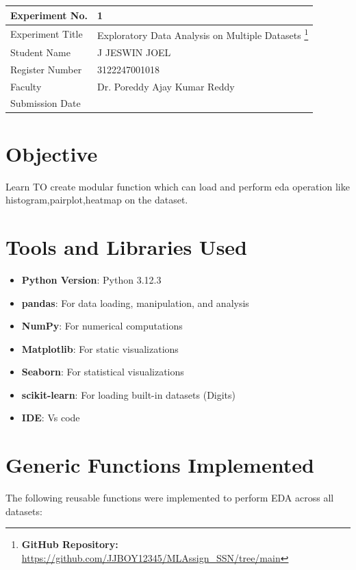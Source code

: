 \documentclass[12pt,a4paper]{article}
\begin{document}
\begin{tabular}{|p{4cm}|p{11cm}|}
\hline
Experiment No. & 1 \\ \hline
Experiment Title &
Exploratory Data Analysis on Multiple Datasets
\footnote{\textbf{GitHub Repository: }\url{https://github.com/JJBOY12345/MLAssign_SSN/tree/main}}\\ \hline
Student Name  & J JESWIN JOEL \\ \hline
Register Number & 3122247001018  \\ \hline
Faculty & Dr. Poreddy Ajay Kumar Reddy \\ \hline
Submission Date & \\ \hline
\end{tabular}

\section{Objective}
Learn TO create modular function which can load and perform eda operation like histogram,pairplot,heatmap on the dataset.
\section{Tools and Libraries Used}
\begin{itemize}
    \item \textbf{Python Version}: Python 3.12.3
    \item \textbf{pandas}: For data loading, manipulation, and analysis
    \item \textbf{NumPy}: For numerical computations
    \item \textbf{Matplotlib}: For static visualizations
    \item \textbf{Seaborn}: For statistical visualizations
    \item \textbf{scikit-learn}: For loading built-in datasets (Digits)
    \item \textbf{IDE}: Vs code
\end{itemize}

\section{Generic Functions Implemented}
The following reusable functions were implemented to perform EDA across all datasets:
\end{document}
